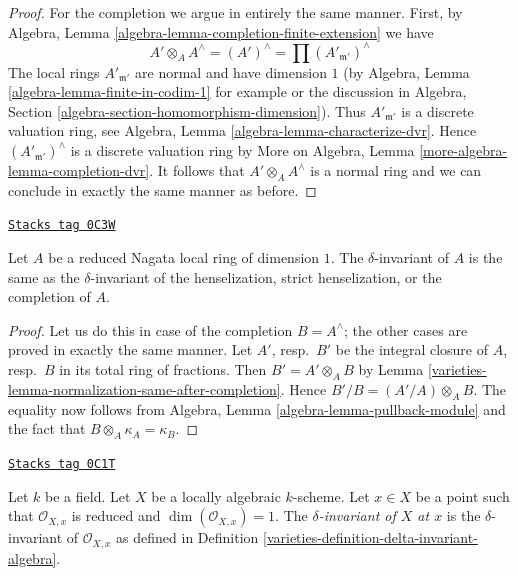 \begin{proof}
\medskip\noindent
For the completion we argue in entirely the same manner. First,
by Algebra, Lemma \ref{algebra-lemma-completion-finite-extension} we have
$$
A' \otimes_A A^\wedge = (A')^\wedge =
\prod\nolimits (A'_{\mathfrak m'})^\wedge
$$
The local rings $A'_{\mathfrak m'}$ are normal and have dimension $1$
(by Algebra, Lemma \ref{algebra-lemma-finite-in-codim-1} for example or
the discussion in
Algebra, Section \ref{algebra-section-homomorphism-dimension}).
Thus $A'_{\mathfrak m'}$ is a discrete valuation ring, see
Algebra, Lemma \ref{algebra-lemma-characterize-dvr}.
Hence $(A'_{\mathfrak m'})^\wedge$ is a discrete valuation ring
by More on Algebra, Lemma \ref{more-algebra-lemma-completion-dvr}.
It follows that $A' \otimes_A A^\wedge$ is a normal ring and
we can conclude in exactly the same manner as before.
\end{proof}

\begin{lemma}
\label{varieties-lemma-delta-same-after-completion}
\href{https://stacks.math.columbia.edu/tag/0C3W}{\texttt{Stacks tag 0C3W}}

Let $A$ be a reduced Nagata local ring of dimension $1$.
The $\delta$-invariant of $A$ is the same as the
$\delta$-invariant of the henselization, strict henselization,
or the completion of $A$.
\end{lemma}

\begin{proof}

Let us do this in case of the completion $B = A^\wedge$;
the other cases are proved in exactly the same manner.
Let $A'$, resp.\ $B'$ be the integral closure of $A$, resp.\ $B$
in its total ring of fractions.
Then $B' = A' \otimes_A B$ by
Lemma \ref{varieties-lemma-normalization-same-after-completion}.
Hence $B'/B = (A'/A) \otimes_A B$.
The equality now follows from
Algebra, Lemma \ref{algebra-lemma-pullback-module}
and the fact that $B \otimes_A \kappa_A = \kappa_B$.
\end{proof}

\begin{definition}
\label{varieties-definition-delta-invariant}
\href{https://stacks.math.columbia.edu/tag/0C1T}{\texttt{Stacks tag 0C1T}}

Let $k$ be a field. Let $X$ be a locally algebraic $k$-scheme.
Let $x \in X$ be a point such that $\mathcal{O}_{X, x}$
is reduced and $\dim(\mathcal{O}_{X, x}) = 1$.
The {\it $\delta$-invariant of $X$ at $x$} is the
$\delta$-invariant of $\mathcal{O}_{X, x}$ as defined in
Definition \ref{varieties-definition-delta-invariant-algebra}.
\end{definition}

